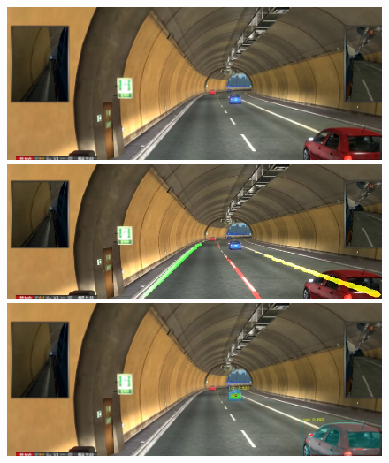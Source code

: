 \documentclass[runningheads]{llncs}
\begin{document}
\begin{figure}[!htb]
	\includegraphics[width=\linewidth]{result/w000107.jpg}
	\endminipage\hfill
	\includegraphics[width=\linewidth]{result/w000107-lane.jpg}
	\endminipage\hfill
	\includegraphics[width=\linewidth]{result/w000107-obj.jpg}
	\endminipage


\end{figure}
\end{document}

